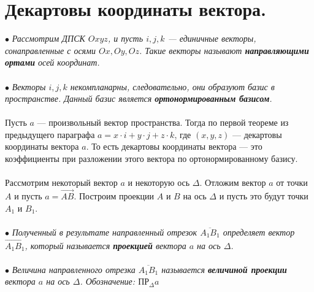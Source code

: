 \section{Декартовы координаты вектора.}
$\bullet$ \textit{Рассмотрим ДПСК $Oxyz$, и пусть $i, j, k$ --- единичные векторы, сонаправленные с осями $Ox, Oy, Oz$. Такие векторы называют \textbf{направляющими ортами} осей координат.}\\\\
$\bullet$ \textit{Векторы $i, j, k$ некомпланарны, следовательно, они образуют базис в пространстве. Данный базис является \textbf{ортонормированным базисом}.}\\\\
Пусть $a$ --- произвольный вектор пространства. Тогда по первой теореме из предыдущего параграфа $a = x\cdot i + y\cdot j + z\cdot k$, где $(x, y, z)$ --- декартовы координаты вектора $a$. То есть декартовы координаты вектора --- это коэффициенты при разложении этого вектора по ортонормированному базису.\\\\
Рассмотрим некоторый вектор $a$ и некоторую ось $\Delta$. Отложим вектор $a$ от точки $A$ и пусть $a = \overrightarrow{AB}$. Построим проекции $A$ и $B$ на ось $\Delta$ и пусть это будут точки $A_1$ и $B_1$.\\\\
$\bullet$ \textit{Полученный в результате направленный отрезок $\overline{A_1B_1}$ определяет вектор $\overrightarrow{A_1B_1}$, который называется \textbf{проекцией} вектора $a$ на ось $\Delta$.}\\\\
$\bullet$ \textit{Величина направленного отрезка $\overline{A_1B_1}$ называется \textbf{величиной проекции} вектора $a$ на ось $\Delta$. Обозначение: $\text{ПР}_\Delta a$}\\\\
